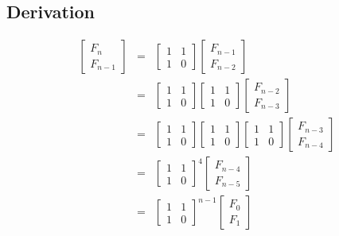 \subsection*{Derivation}
\begin{eqnarray*}
\begin{bmatrix}
	F_n\\
	F_{n-1}
\end{bmatrix}	
&=&
\begin{bmatrix}
	1 & 1\\
	1 & 0
\end{bmatrix}
\begin{bmatrix}
	F_{n-1}\\
	F_{n-2}
\end{bmatrix}\\
&=&
\begin{bmatrix}
	1 & 1\\
	1 & 0
\end{bmatrix}
\begin{bmatrix}
	1 & 1\\
	1 & 0
\end{bmatrix}
\begin{bmatrix}
	F_{n-2}\\
	F_{n-3}
\end{bmatrix}\\
&=&
\begin{bmatrix}
	1 & 1\\
	1 & 0
\end{bmatrix}
\begin{bmatrix}
	1 & 1\\
	1 & 0
\end{bmatrix}
\begin{bmatrix}
	1 & 1\\
	1 & 0
\end{bmatrix}
\begin{bmatrix}
	F_{n-3}\\
	F_{n-4}
\end{bmatrix}\\
&=&
\begin{bmatrix}
	1 & 1\\
	1 & 0
\end{bmatrix}^4
\begin{bmatrix}
	F_{n-4}\\
	F_{n-5}
\end{bmatrix}\\
&=&
\begin{bmatrix}
	1 & 1\\
	1 & 0
\end{bmatrix}^{n-1}
\begin{bmatrix}
	F_{0}\\
	F_{1}
\end{bmatrix}\\
\end{eqnarray*}
